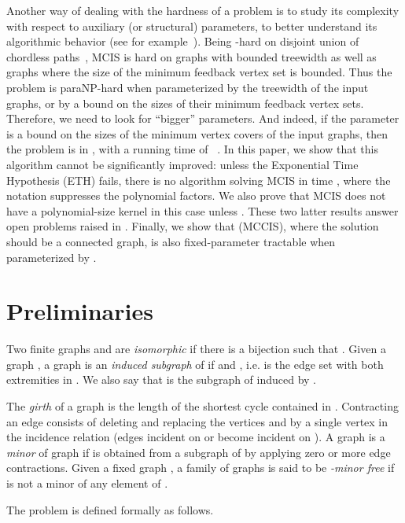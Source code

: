 Another way of dealing with the hardness of a problem is to study its complexity with respect to auxiliary (or structural) parameters, to better  understand its algorithmic behavior (see for example~\cite{FellowsJR13}).
Being -hard on disjoint union of chordless paths~\cite{Damaschke1991}, MCIS is hard on graphs with bounded treewidth as well as graphs where the size of the minimum feedback vertex set is bounded. 
Thus the problem is paraNP-hard when parameterized by the treewidth of the input graphs, or by a bound on the sizes of their minimum feedback vertex sets.
Therefore, we need to look for ``bigger'' parameters.
And indeed, if the parameter  is a bound on the sizes of the minimum vertex 
covers of the input graphs, 
then the problem is in , with a running time of ~\cite{AbuKhzam2014}.
In this paper, we show that this algorithm cannot be significantly improved: 
unless the Exponential Time Hypothesis 
(ETH) fails, there is no algorithm solving MCIS in time , where the  notation suppresses the polynomial factors.
We also prove 
that MCIS does not have a polynomial-size kernel in this case unless . 
These two latter results answer open problems raised in \cite{AbuKhzam2014}.
Finally, we show that \mccis (MCCIS), where the solution should be a connected 
graph, is also fixed-parameter tractable when parameterized by .

\section{Preliminaries}
\label{prelims}

Two finite graphs  and  are \textit{isomorphic} 
if there 
is a bijection  such that . Given a graph , a graph  
 is an \textit{induced subgraph} of  if  and 
  , i.e.  is the edge set with both 
extremities in . We also say that  is the subgraph of  induced by . 

The \textit{girth} of a graph  is the length of the shortest cycle contained in . 
Contracting an edge  consists of deleting  and replacing the vertices  and  by a single vertex  in the incidence relation (edges incident on  or  become incident on ).
A graph  is a \textit{minor} of graph  if  is obtained from a subgraph of  by applying zero or more edge contractions. Given a fixed graph , a family  of graphs is said to be \textit{-minor free} if  is not a minor of any element of .


The \mcis problem is defined formally as follows. 






